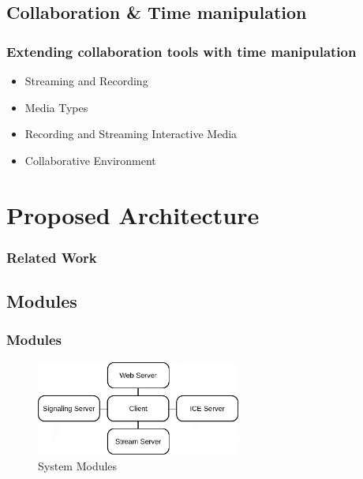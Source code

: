 \documentclass[compress]{beamer}
\begin{document}
	\subsection{Collaboration \& Time manipulation}
  		\begin{frame}[c]
		\frametitle{Extending collaboration tools with time manipulation}
		\begin{itemize}
		\item Streaming and Recording
		\vfill
		\item Media Types
		\vfill
		\item Recording and Streaming Interactive Media
		\vfill
		\item Collaborative Environment
		\end{itemize}
		\end{frame}





\section{Proposed Architecture}\label{arch}

\begin{frame}[t,shrink]
\frametitle{Related Work} 
\end{frame}

\subsection{Modules}

	\begin{frame}[c]
		\frametitle{Modules}
		\begin{figure}[H]
			\includegraphics[width=0.6\textwidth]{figures/archs.png}
			\caption{System Modules}
		\end{figure}
	\end{frame}
\end{document}
